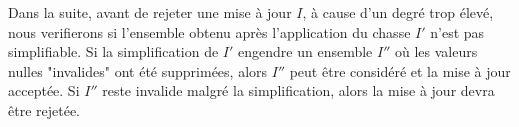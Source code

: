 Dans la suite, avant de rejeter une mise à jour $I$, à cause d'un degré trop élevé, nous verifierons si l'ensemble obtenu après l'application du chasse $I'$ n'est pas simplifiable.
Si la simplification de $I'$ engendre un ensemble $I''$ où les valeurs nulles "invalides" ont été supprimées, alors $I''$ peut être considéré et la mise à jour acceptée.
Si $I''$ reste invalide malgré la simplification, alors la mise à jour devra être rejetée.



